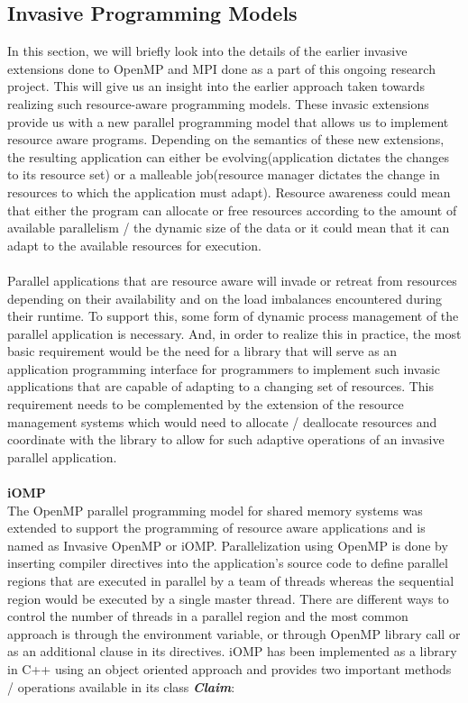 \subsection{Invasive Programming Models}
In this section, we will briefly look into the details of the earlier invasive extensions done to OpenMP and MPI done as a part of this ongoing research project. This will give us an insight into the earlier approach taken towards realizing such resource-aware programming models. These invasic extensions provide us with a new parallel programming model that allows us to implement resource aware programs. Depending on the semantics of these new extensions, the resulting application can either be evolving(application dictates the changes to its resource set) or a malleable job(resource manager dictates the change in resources to which the application must adapt). Resource awareness could mean that either the program can allocate or free resources according to the amount of available parallelism / the dynamic size of the data or it could mean that it can adapt to the available resources for execution.\\ \\
Parallel applications that are resource aware will invade or retreat from resources depending on their availability and on the load imbalances encountered during their runtime. To support this, some form of dynamic process management of the parallel application is necessary. And, in order to realize this in practice, the most basic requirement would be the need for a library that will serve as an application programming interface for programmers to implement such invasic applications that are capable of adapting to a changing set of resources. This requirement needs to be complemented by the extension of the resource management systems which would need to allocate / deallocate resources and coordinate with the library to allow for such adaptive operations of an invasive parallel application.\\ \\
\textbf{iOMP}\\
The OpenMP parallel programming model for shared memory systems was extended to support the programming of resource aware applications and is named as Invasive OpenMP or iOMP. Parallelization using OpenMP is done by inserting compiler directives into the application's source code to define parallel regions that are executed in parallel by a team of threads whereas the sequential region would be executed by a single master thread. There are different ways to control the number of threads in a parallel region and the most common approach is through the environment variable, or through OpenMP library call or as an additional clause in its directives. iOMP has been implemented as a library in C++ using an object oriented approach and provides two important methods / operations available in its class \textbf{\textit{Claim}}:

